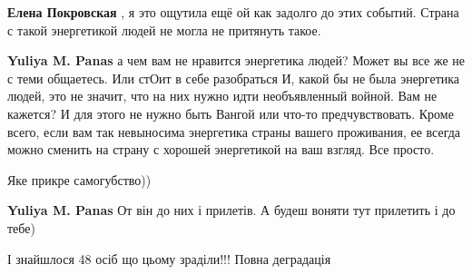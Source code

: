 \begin{itemize}
\begin{itemize}
\begin{itemize}
\textbf{Елена Покровская} , я это ощутила ещё ой как задолго до этих событий. Страна с такой энергетикой людей не могла не притянуть такое.

 
\textbf{Yuliya M. Panas} а чем вам не нравится энергетика людей? Может вы все же
не с теми общаетесь. Или стОит в себе разобраться И, какой бы не была энергетика
людей, это не значит, что на них нужно идти необъявленный войной. Вам не кажется? И
для этого не нужно быть Вангой или что-то предчувствовать. Кроме всего, если вам
так невыносима энергетика страны вашего проживания, ее всегда можно сменить на
страну с хорошей энергетикой на ваш взгляд. Все просто.

 
Яке прикре самогубство))

 
\textbf{Yuliya M. Panas} От він до них і прилетів. А будеш воняти тут прилетить і до тебе)

\end{itemize}

\end{itemize}

 
І знайшлося 48 осіб що цьому зраділи!!! Повна деградація

\begin{itemize}
 

\end{itemize}
\end{itemize}
